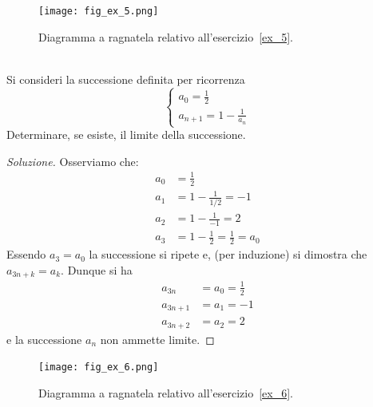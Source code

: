 \newsavebox{\qrexcinque}
\begin{figure}
 \begin{center}
    \texttt{[image: fig\_ex\_5.png]}
  \end{center}
  \caption{Diagramma a ragnatela relativo
    all'esercizio~\ref{ex_5}.
    \ifwidemargin\\\\\fi%
    \usebox{\qrexcinque}}
  \label{fig_ex_5}
\end{figure}

\begin{exercise}\label{ex_5}
  Si consideri la successione definita per ricorrenza
  \[
  \begin{cases}
    a_0 = \frac 1 2\\
    a_{n+1} = 1 - \frac{1}{a_n}
  \end{cases}
  \]
  Determinare, se esiste, il limite della successione.
\end{exercise}

\begin{proof}[Soluzione]
  Osserviamo che:
  \begin{align*}
    a_0 &= \frac 1 2 \\
    a_1 &= 1 - \frac{1}{1/2} = -1\\
    a_2 &= 1 - \frac{1}{-1} = 2\\
    a_3 &= 1 - \frac{1}{2} = \frac 1 2 = a_0
  \end{align*}
  Essendo $a_3 = a_0$ la successione si ripete e, (per induzione) si
  dimostra che $a_{3n+k} = a_k$. Dunque si ha
  \begin{align*}
    a_{3n} &= a_0 = \frac 1 2\\
    a_{3n+1} &= a_1 = -1\\
    a_{3n+2} &= a_2 = 2
  \end{align*}
  e la successione $a_n$ non ammette limite.
\end{proof}

\newsavebox{\qrexsei}
\begin{figure}
  \begin{center}
    \texttt{[image: fig\_ex\_6.png]}
  \end{center}
  \caption{Diagramma a ragnatela relativo
    all'esercizio~\ref{ex_6}.
    \ifwidemargin\\\\\fi%
    \usebox{\qrexsei}}
  \label{fig_ex_6}
\end{figure}

